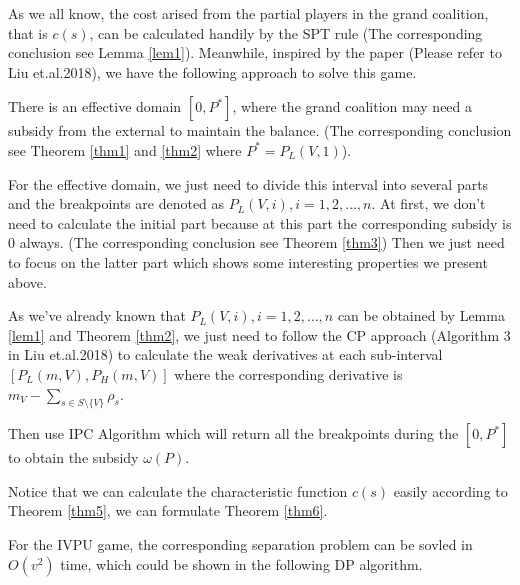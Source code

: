 As we all know, the cost arised from the partial players in the grand coalition, that is $c(s)$, can be calculated handily by the SPT rule (The corresponding conclusion see Lemma \ref{lem1}). Meanwhile, inspired by the paper (Please refer to Liu et.al.2018), we have the following approach to solve this game.

There is an effective domain $[0, P^*]$, where the grand coalition may need a subsidy from the external to maintain the balance.
(The corresponding conclusion see Theorem \ref{thm1} and \ref{thm2} where $P^* = P_L(V,1)$).

For the effective domain, we just need to divide this interval into several parts and the breakpoints are denoted as $P_L(V,i), i = 1,2,\ldots,n$.  At first, we don't need to calculate the initial part because at this part the corresponding subsidy is 0 always. (The corresponding conclusion see Theorem \ref{thm3}) Then we just need to focus on the latter part which shows some interesting properties we present above.

As we've already known that $P_L(V,i), i = 1,2,\ldots,n$ can be obtained by Lemma \ref{lem1} and Theorem \ref{thm2}, we just need to follow the CP approach (Algorithm 3 in Liu et.al.2018) to calculate the weak derivatives at each sub-interval $[P_L(m,V),P_H(m,V)]$ where the corresponding derivative is $m_V-\sum_{s\in S\setminus\{V\}} \rho_s$.

Then use IPC Algorithm which will return all the breakpoints during the $[0, P^*]$ to obtain the subsidy $\omega(P)$.

Notice that we can calculate the characteristic function $c(s)$ easily according to Theorem \ref{thm5}, we can formulate Theorem \ref{thm6}.

\begin{lem}\label{lem5}
  For the IVPU game, the corresponding separation problem can be sovled in $O(v^2)$ time, which could be shown in the following DP algorithm.
\end{lem}

